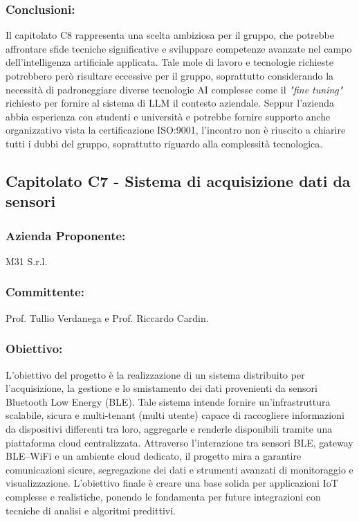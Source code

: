 \documentclass[a4paper,12pt]{article}
\begin{document}
\subsubsection*{Conclusioni:}
Il capitolato C8 rappresenta una scelta ambiziosa per il gruppo, che potrebbe affrontare sfide tecniche significative e sviluppare competenze avanzate nel campo dell'intelligenza artificiale applicata.
Tale mole di lavoro e tecnologie richieste potrebbero però risultare eccessive per il gruppo, soprattutto considerando la necessità di padroneggiare diverse tecnologie AI complesse come il \textit{"fine tuning"} richiesto per fornire al sistema di LLM il contesto aziendale. 
Seppur l'azienda abbia esperienza con studenti e università e potrebbe fornire supporto anche organizzativo vista la certificazione ISO:9001, l'incontro non è riuscito a chiarire tutti i dubbi del gruppo, soprattutto riguardo alla complessità tecnologica.
\vspace{2.0cm}

\subsection{ Capitolato C7 - Sistema di acquisizione dati da sensori}
\subsubsection*{Azienda Proponente:} M31 S.r.l.
\subsubsection*{Committente:} Prof. Tullio Verdanega e Prof. Riccardo Cardin.
\subsubsection*{Obiettivo:} 
L’obiettivo del progetto è la realizzazione di un sistema distribuito per l’acquisizione, la gestione e lo smistamento dei dati provenienti da sensori Bluetooth Low Energy (BLE). Tale sistema intende fornire un’infrastruttura scalabile, sicura e multi-tenant (multi utente) capace di raccogliere informazioni da dispositivi differenti tra loro, aggregarle e renderle disponibili tramite una piattaforma cloud centralizzata.
Attraverso l’interazione tra sensori BLE, gateway BLE–WiFi e un ambiente cloud dedicato, il progetto mira a garantire comunicazioni sicure, segregazione dei dati e strumenti avanzati di monitoraggio e visualizzazione. L’obiettivo finale è creare una base solida per applicazioni IoT complesse e realistiche, ponendo le fondamenta per future integrazioni con tecniche di analisi e algoritmi predittivi.
\end{document}
